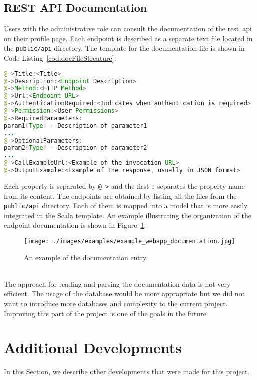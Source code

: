 \subsection{REST API Documentation}
\label{subsec:restAPIDcos}
Users with the administrative role can consult the documentation of the \gls{rest}~\gls{api} on their profile page. Each endpoint is described as a separate text file located in the \verb"public/api" directory. The template for the documentation file is shown in Code Listing~\ref{cod:docFileStrcuture}:\\
\begin{lstlisting}[language=Java,caption={Organization of the documentation information.},label={cod:docFileStrcuture}, frame=bt,belowskip=3em]
@->Title:<Title>
@->Description:<Endpoint Description>
@->Method:<HTTP Method>
@->Url:<Endpoint URL>
@->AuthenticationRequired:<Indicates when authentication is required>
@->Permission:<User Permissions>
@->RequiredParameters:
param1[Type] - Description of parameter1
...
@->OptionalParameters:
param2[Type] - Description of parameter2
...
@->CallExampleUrl:<Example of the invocation URL>
@->OutputExample:<Example of the response, usually in JSON format>
\end{lstlisting} 
Each property is separated by \verb"@->" and the first \verb':' separates the property name from its content. The endpoints are obtained by listing all the files from the \verb"public/api" directory. Each of them is mapped into a model that is more easily integrated in the Scala template. An example illustrating the organization of the endpoint documentation is shown in Figure~\ref{fig:exDocEntry}.\\
\begin{figure}[h!]
 \centering
   \texttt{[image: ./images/examples/example\_webapp\_documentation.jpg]}
   \caption{An example of the documentation entry.}
   \label{fig:exDocEntry}
\end{figure}
\\
The approach for reading and parsing the documentation data is not very efficient. The usage of the database would be more appropriate but we did not want to introduce more databases and complexity to the current project. Improving this part of the project is one of the goals in the future.
\section{Additional Developments}
\label{sec:additionalImplementation}
In this Section, we describe other developments that were made for this project.
